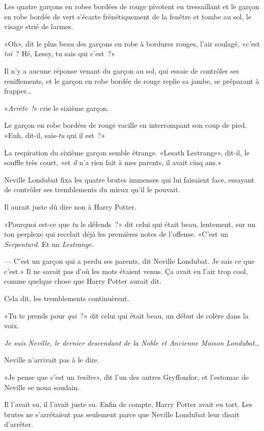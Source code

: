 Les quatre garçons en robes bordées de rouge pivotent en tressaillant et le garçon en robe bordée de vert s'écarte frénétiquement de la fenêtre et tombe au sol, le visage strié de larmes.

«Oh», dit le plus beau des garçons en robe à bordures rouges, l'air soulagé, «c'est \emph{toi}~? Hé, Lessy, tu sais qui c'est~?»

Il n'y a aucune réponse venant du garçon au sol, qui essaie de contrôler ses reniflements, et le garçon en robe bordée de rouge replie sa jambe, se préparant à frapper…

«\emph{Arrête~!}» crie le sixième garçon.

Le garçon en robe bordées de rouge vacille en interrompant son coup de pied. «Euh, dit-il, sais-\emph{tu} qui il est~?»

La respiration du sixième garçon semble étrange. «Lesath Lestrange», dit-il, le souffle très court, «et \emph{il} n'a rien fait à mes parents, il avait cinq ans.»

\later

Neville Londubat fixa les quatre brutes immenses qui lui faisaient face, essayant de contrôler ses tremblements du mieux qu'il le pouvait.

Il aurait juste dû dire non à Harry Potter.

«Pourquoi est-ce que \emph{tu} le défends~?» dit celui qui était beau, lentement, sur un ton perplexe qui recelait déjà les premières notes de l'offense. «C'est un \emph{Serpentard}. Et un \emph{Lestrange}.

--- C'est un garçon qui a perdu ses parents, dit Neville Londubat. Je sais ce que c'est.» Il ne savait pas d'où les mots étaient venus. Ça avait eu l'air trop cool, comme quelque chose que Harry Potter aurait dit.

Cela dit, les tremblements continuèrent.

«Tu te prends pour \emph{qui}~?» dit celui qui était beau, un début de colère dans la voix.

\emph{Je suis Neville, le dernier descendant de la Noble et Ancienne Maison Londubat…}

Neville n'arrivait pas à le dire.

«Je pense que c'est un \emph{traître}», dit l'un des autres Gryffondor, et l'estomac de Neville se noua soudain.

Il l'avait su, il l'avait juste su. Enfin de compte, Harry Potter avait eu tort. Les brutes ne s'arrêtaient pas seulement parce que Neville Londubat leur disait d'arrêter.

